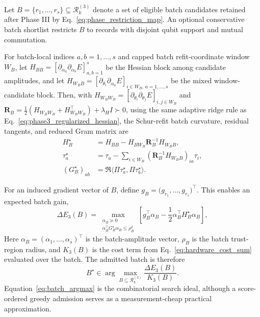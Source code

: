 \documentclass[
  reprint,
  amsmath,
  amssymb,
  aps,
  pra,
  nofootinbib,
  superscriptaddress,
  floatfix
]{revtex4-2}
\begin{document}
Let \(B=\{r_1,\ldots,r_s\}\subseteq\mathcal R_k^{(3)}\) denote a set of eligible batch candidates retained after Phase III by Eq.~\eqref{eq:phase_restriction_map}. An optional conservative batch shortlist restricts \(B\) to records with disjoint qubit support and mutual commutation.

For batch-local indices \(a,b=1,\ldots,s\) and capped batch refit-coordinate window \(W_B\), let $H_{BB}=[\partial_{\alpha_a}\partial_{\alpha_b}E]_{a,b=1}^s$ be the Hessian block among candidate amplitudes, and let $H_{W_BB}=[\partial_{\theta_i}\partial_{\alpha_a}E]_{i\in W_B,\,a=1,\ldots,s}$ be the mixed window-candidate block. Then, with $H_{W_BW_B}=[\partial_{\theta_i}\partial_{\theta_j}E]_{i,j\in W_B}$ and $\mathbf R_B=\frac12(H_{W_BW_B}+H_{W_BW_B}^{\top})+\lambda_HI\succ0$, using the same adaptive ridge rule as Eq.~\eqref{eq:phase3_regularized_hessian}, the Schur-refit batch curvature, residual tangents, and reduced Gram matrix are
\begin{equation*}
\begin{aligned}
H_B^\star
&=
H_{BB}
-
H_{BW_B}\mathbf R_B^{-1}H_{W_BB},\\
\tau_a^\star
&=\tau_a-\sum_{i\in W_B}(\mathbf R_B^{-1}H_{W_BB})_{ia}\tau_i,\\
(G_B^\star)_{ab}
&=\Re\langle \Pi\tau_a^\star,\Pi\tau_b^\star\rangle .
\end{aligned}
\end{equation*}

For an induced gradient vector of $B$, define \(g_B=\big(g_{r_1},\ldots,g_{r_s}\big)^\top\). This enables an expected batch gain,
\begin{equation*}
\Delta E_3(B)
=
\max_{\substack{\alpha_B\succeq0\\\alpha_B^\top G_B^\star\alpha_B\le \rho_B^2}}
\left[
g_B^\top\alpha_B
-
\frac12\alpha_B^\top H_B^\star\alpha_B
\right],
\end{equation*}
Here \(\alpha_B=(\alpha_1,\ldots,\alpha_s)^\top\) is the batch-amplitude vector, \(\rho_B\) is the batch trust-region radius, and \(K_3(B)\) is the cost term from Eq.~\eqref{eq:hardware_cost_sum} evaluated over the batch. The admitted batch is therefore
\begin{equation}
B^\star\in\arg\max_{B\subseteq\mathcal R_k^{(3)}}\frac{\Delta E_3(B)}{K_3(B)}.
\label{eq:batch_argmax}
\end{equation}
Equation~\eqref{eq:batch_argmax} is the combinatorial search ideal, although a score-ordered greedy admission serves as a measurement-cheap practical approximation. 
\end{document}
